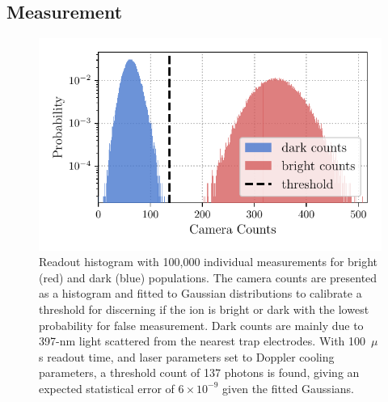 \subsection{Measurement}
\label{sec:Measurement}
    \begin{figure}
        \begin{center}
        \noindent\includegraphics[width=0.75\linewidth]{
            figures/pdf_figure/readout_hist.pdf
            }
        \end{center}
        \caption{
            Readout histogram with 100,000 individual measurements for bright (red) and dark (blue) populations. The camera counts are presented as a histogram and fitted to Gaussian distributions to calibrate a threshold for discerning if the ion is bright or dark with the lowest probability for false measurement. Dark counts are mainly due to 397-nm light scattered from the nearest trap electrodes. With 100~$\mu$s readout time, and laser parameters set to Doppler cooling parameters, a threshold count of 137 photons is found, giving an expected statistical error of $6\times 10^{-9}$ given the fitted Gaussians. %
            }
        \label{fig:readout_histogram}
    \end{figure}


